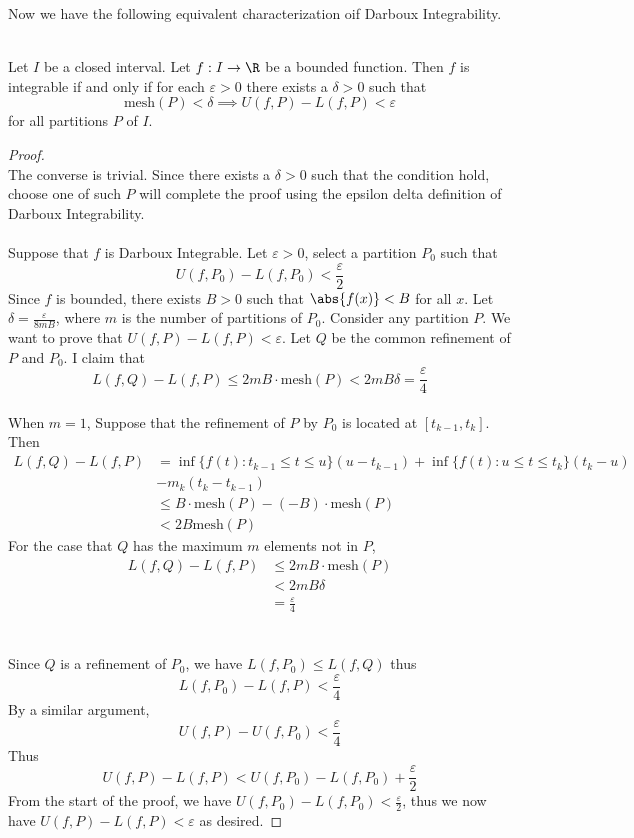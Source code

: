 \documentclass[a4paper]{article}
\begin{document}
Now we have the following equivalent characterization oif Darboux Integrability. 

\begin{prp}{}{}\\
Let $I$ be a closed interval. Let $f:I\to\R$ be a bounded function. Then $f$ is integrable if and only if for each $\varepsilon>0$ there exists a $\delta>0$ such that $$\text{mesh}(P)<\delta\implies U(f,P)-L(f,P)<\varepsilon$$ for all partitions $P$ of $I$. 
\begin{proof}\\ The converse is trivial. Since there exists a $\delta>0$ such that the condition hold, choose one of such $P$ will complete the proof using the epsilon delta definition of Darboux Integrability. \\~\\
Suppose that $f$ is Darboux Integrable. Let $\varepsilon>0$, select a partition $P_0$ such that $$U(f,P_0)-L(f,P_0)<\frac{\varepsilon}{2}$$ Since $f$ is bounded, there exists $B>0$ such that $\abs{f(x)}<B$ for all $x$. Let $\delta
=\frac{\varepsilon}{8mB}$, where $m$ is the number of partitions of $P_0$. Consider any partition $P$. We want to prove that $U(f,P)-L(f,P)<\varepsilon$. Let $Q$ be the common refinement of $P$ and $P_0$. I claim that $$L(f,Q)-L(f,P)\leq 2mB\cdot\text{mesh}(P)<2mB\delta=\frac{\varepsilon}{4}$$\\
When $m=1$, Suppose that the refinement of $P$ by $P_0$ is located at $[t_{k-1},t_k]$. Then 
\begin{align*}
L(f,Q)-L(f,P)&=\inf\{f(t):t_{k-1}\leq t\leq u\}(u-t_{k-1})+\inf\{f(t):u\leq t\leq t_k\}(t_k-u)\\
&-m_k(t_k-t_{k-1})\\
&\leq B\cdot\text{mesh}(P)-(-B)\cdot\text{mesh}(P)\tag{$-B$ is a minimum of $f(x)$}\\
&<2B\text{mesh}(P)
\end{align*}
For the case that $Q$ has the maximum $m$ elements not in $P$, 
\begin{align*}
L(f,Q)-L(f,P)&\leq 2mB\cdot\text{mesh}(P)\tag{Same argument as the case for $m=1$}\\
&<2mB\delta\\
&=\frac{\varepsilon}{4}\tag{constructed $\delta$}
\end{align*}
\\~\\
Since $Q$ is a refinement of $P_0$, we have $L(f,P_0)\leq L(f,Q)$ thus $$L(f,P_0)-L(f,P)<\frac{\varepsilon}{4}$$ By a similar argument, $$U(f,P)-U(f,P_0)<\frac{\varepsilon}{4}$$
Thus $$U(f,P)-L(f,P)<U(f,P_0)-L(f,P_0)+\frac{\varepsilon}{2}$$ From the start of the proof, we have $U(f,P_0)-L(f,P_0)<\frac{\varepsilon}{2}$, thus we now have $U(f,P)-L(f,P)<\varepsilon$ as desired. 
\end{proof}
\end{prp}
\end{document}
